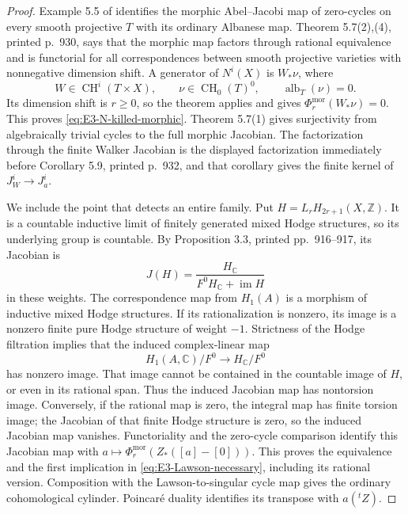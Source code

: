 \begin{proof}
Example 5.5 of \citet[p.~928]{cyWalker2007Morphic} identifies
the morphic Abel--Jacobi map of zero-cycles on every smooth
projective $T$ with its ordinary Albanese map.
Theorem 5.7(2),(4), printed p.~930, says that the morphic
map factors through rational equivalence and is functorial
for all correspondences between smooth projective varieties
with nonnegative dimension shift. A generator of $N^i(X)$
is $W_*\nu$, where
\[
 W\in\operatorname{CH}^i(T\times X),\qquad
 \nu\in\operatorname{CH}_0(T)^0,\qquad
 \operatorname{alb}_T(\nu)=0.
\]
Its dimension shift is $r\ge0$, so the theorem applies and
gives $\Phi^{\mathrm{mor}}_r(W_*\nu)=0$. This proves
\eqref{eq:E3-N-killed-morphic}. Theorem 5.7(1) gives
surjectivity from algebraically trivial cycles to the full
morphic Jacobian. The factorization through the finite
Walker Jacobian is the displayed factorization immediately
before Corollary 5.9, printed p.~932, and that corollary
gives the finite kernel of $J_W^i\to J_a^i$.

We include the point that detects an entire family. Put
$H=L_rH_{2r+1}(X,\mathbb Z)$. It is a countable inductive
limit of finitely generated mixed Hodge structures, so its
underlying group is countable. By Proposition 3.3, printed
pp.~916--917, its Jacobian is
\[
 J(H)=\frac{H_{\mathbb C}}{F^0H_{\mathbb C}+\operatorname{im}H}
\]
in these weights. The correspondence map from $H_1(A)$ is
a morphism of inductive mixed Hodge structures. If its
rationalization is nonzero, its image is a nonzero finite
pure Hodge structure of weight $-1$. Strictness of the
Hodge filtration implies that the induced complex-linear
map
\[
 H_1(A,\mathbb C)/F^0
               \longrightarrow H_{\mathbb C}/F^0
\]
has nonzero image. That image cannot be contained in the
countable image of $H$, or even in its rational span.
Thus the induced Jacobian map has nontorsion image.
Conversely, if the rational map is zero, the integral
map has finite torsion image; the Jacobian of that finite
Hodge structure is zero, so the induced Jacobian map
vanishes. Functoriality and the zero-cycle comparison
identify this Jacobian map with
$a\mapsto\Phi^{\mathrm{mor}}_r(Z_*([a]-[0]))$.
This proves the equivalence and the first implication in
\eqref{eq:E3-Lawson-necessary}, including its rational
version. Composition with the Lawson-to-singular cycle
map gives the ordinary cohomological cylinder. Poincar\'e
duality identifies its transpose with $a({}^tZ)$.
\end{proof}

